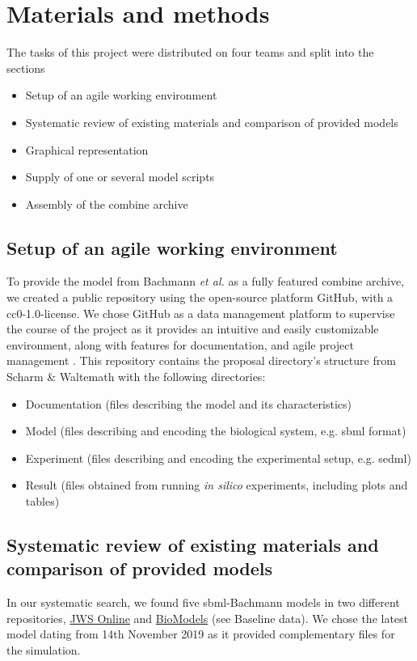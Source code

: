 \section*{Materials and methods} \label{sec:matmet}

The tasks of this project were distributed on  four teams and split into the sections 
\begin{itemize}
    \item Setup of an agile working environment
    \item Systematic review of existing materials and comparison of provided models
    \item Graphical representation
    \item Supply of one or several model scripts
    \item Assembly of the \acs{combine} archive
\end{itemize}

\subsection*{Setup of an agile working environment} \label{setupagwork}
To provide the model from Bachmann \textit{et al.} \cite{bachmannmodel} as a fully featured \ac{combine} archive, we created a public repository using the open-source platform GitHub, with a \ac{cc}0-1.0-license. We chose GitHub as a data management platform to supervise the course of the project as it provides an intuitive and easily customizable environment, along with features for documentation, and agile project management \cite{github}. This repository contains the proposal directory's structure from Scharm \& Waltemath \cite{combine} with the following directories:
\begin{itemize}
    \item Documentation (files describing the model and its characteristics)
    \item Model (files describing and encoding the biological system, e.g. \ac{sbml} format)
    \item Experiment (files describing and encoding the experimental setup, e.g. \ac{sedml})
    \item Result (files obtained from running \textit{in silico} experiments, including plots and tables)
\end{itemize}

\subsection*{Systematic review of existing materials and comparison of provided models}
In our systematic search, we found five \ac{sbml}-Bachmann models in two different repositories, \hyperlink{https://www.systemsmedicine.net/posts/jws-online-biological-systems-modelling}{JWS Online} and \hyperlink{https://www.ebi.ac.uk/biomodels/}{BioModels} (see Baseline data). We chose the latest model dating from 14th November 2019 as it provided complementary files for the simulation.

